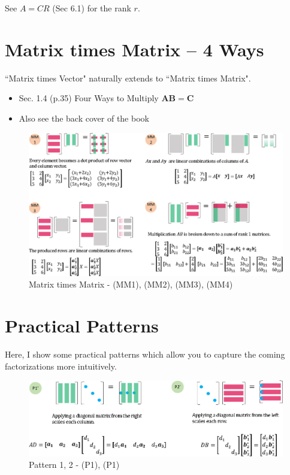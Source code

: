 \documentclass[letterpaper]{article}
\begin{document}
See $A=CR$ (Sec 6.1) for the rank $r$.


\clearpage

\section{Matrix times Matrix -- 4 Ways}

``Matrix times Vector" naturally extends to ``Matrix times Matrix".

\begin{itemize}
  \item Sec. 1.4 (p.35) Four Ways to Multiply $\bm{AB=C}$
  \item Also see the back cover of the book
\end{itemize} 


\begin{figure}[H]
  \includegraphics[keepaspectratio, width=\linewidth]{MatrixTimesMatrix.eps}
  \caption{Matrix times Matrix - (MM1), (MM2), (MM3), (MM4)}
\end{figure}

\clearpage


\section{Practical Patterns}

Here, I show some practical patterns which allow you to capture
the coming factorizations more intuitively.

\begin{figure}[H]
  \includegraphics[keepaspectratio, width=\linewidth]{Pattern12.eps}
  \caption{Pattern 1, 2 - (P1), (P1)}
\end{figure}
\end{document}
